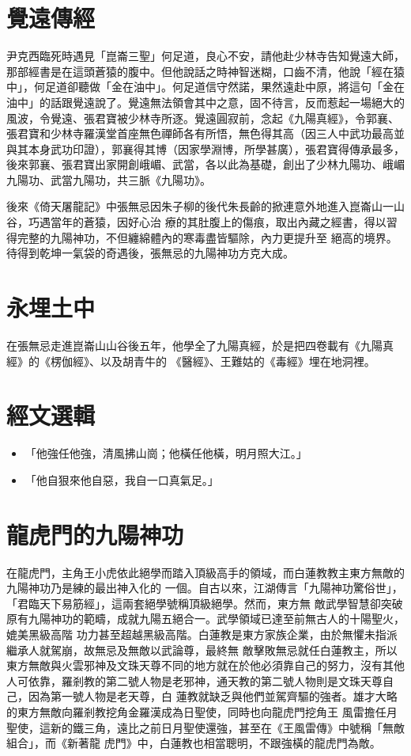\section{覺遠傳經}

尹克西臨死時遇見「崑崙三聖」何足道，良心不安，請他赴少林寺告知覺遠大師，那部經書是在這頭蒼猿的腹中。但他說話之時神智迷糊，口齒不清，他說「經在猿中」，何足道卻聽做「金在油中」。何足道信守然諾，果然遠赴中原，將這句「金在油中」的話跟覺遠說了。覺遠無法領會其中之意，固不待言，反而惹起一場絕大的風波，令覺遠、張君寶被少林寺所逐。覺遠圓寂前，念起《九陽真經》，令郭襄、張君寶和少林寺羅漢堂首座無色禪師各有所悟，無色得其高（因三人中武功最高並與其本身武功印證），郭襄得其博（因家學淵博，所學甚廣），張君寶得傳承最多，後來郭襄、張君寶出家開創峨嵋、武當，各以此為基礎，創出了少林九陽功、峨嵋九陽功、武當九陽功，共三脈《九陽功》。

後來《倚天屠龍記》中張無忌因朱子柳的後代朱長齡的掀連意外地進入崑崙山一山谷，巧遇當年的蒼猿，因好心治
療的其肚腹上的傷痕，取出內藏之經書，得以習得完整的九陽神功，不但纏綿體內的寒毒盡皆驅除，內力更提升至
絕高的境界。待得到乾坤一氣袋的奇遇後，張無忌的九陽神功方克大成。

\section{永埋土中}
在張無忌走進崑崙山山谷後五年，他學全了九陽真經，於是把四卷載有《九陽真經》的《楞伽經》、以及胡青牛的
《醫經》、王難姑的《毒經》埋在地洞裡。

\section{經文選輯}
\begin{itemize}
\item 「他強任他強，清風拂山崗；他橫任他橫，明月照大江。」
\item 「他自狠來他自惡，我自一口真氣足。」
\end{itemize}

\section{龍虎門的九陽神功}

在龍虎門，主角王小虎依此絕學而踏入頂級高手的領域，而白蓮教教主東方無敵的九陽神功乃是練的最出神入化的
一個。自古以來，江湖傳言「九陽神功驚俗世」，「君臨天下易筋經」，這兩套絕學號稱頂級絕學。然而，東方無
敵武學智慧卻突破原有九陽神功的範疇，成就九陽五絕合一。武學領域已達至前無古人的十陽聖火，媲美黑級高階
功力甚至超越黑級高階。白蓮教是東方家族企業，由於無懼未指派繼承人就駕崩，故無忌及無敵以武論尊，最終無
敵擊敗無忌就任白蓮教主，所以東方無敵與火雲邪神及文珠天尊不同的地方就在於他必須靠自己的努力，沒有其他
人可依靠，羅剎教的第二號人物是老邪神，通天教的第二號人物則是文珠天尊自己，因為第一號人物是老天尊，白
蓮教就缺乏與他們並駕齊驅的強者。雄才大略的東方無敵向羅剎教挖角金羅漢成為日聖使，同時也向龍虎門挖角王
風雷擔任月聖使，這新的鐵三角，遠比之前日月聖使還強，甚至在《王風雷傳》中號稱「無敵組合」，而《新著龍
虎門》中，白蓮教也相當聰明，不跟強橫的龍虎門為敵。

